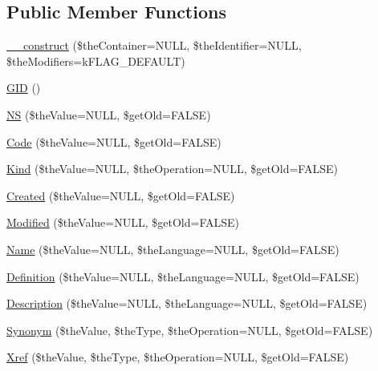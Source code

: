 \subsection*{Public Member Functions}
\begin{DoxyCompactItemize}
\item 
\hyperlink{class_c_ontology_term_object_af1fb502088538ad7372719c20f73bc5c}{\-\_\-\-\_\-construct} (\$the\-Container=N\-U\-L\-L, \$the\-Identifier=N\-U\-L\-L, \$the\-Modifiers=k\-F\-L\-A\-G\-\_\-\-D\-E\-F\-A\-U\-L\-T)
\item 
\hyperlink{class_c_ontology_term_object_ab1a4d21bb56a8a6cf3f77f595d776267}{G\-I\-D} ()
\item 
\hyperlink{class_c_ontology_term_object_a109414a9abe98e3997be238addfda6cf}{N\-S} (\$the\-Value=N\-U\-L\-L, \$get\-Old=F\-A\-L\-S\-E)
\item 
\hyperlink{class_c_ontology_term_object_a07d446b9fde6b99ab766f5c91eeec813}{Code} (\$the\-Value=N\-U\-L\-L, \$get\-Old=F\-A\-L\-S\-E)
\item 
\hyperlink{class_c_ontology_term_object_ad5926fcc0f4263cc31353990c8ab1ad4}{Kind} (\$the\-Value=N\-U\-L\-L, \$the\-Operation=N\-U\-L\-L, \$get\-Old=F\-A\-L\-S\-E)
\item 
\hyperlink{class_c_ontology_term_object_acf58ecff6c65507ecec1d23516c90d02}{Created} (\$the\-Value=N\-U\-L\-L, \$get\-Old=F\-A\-L\-S\-E)
\item 
\hyperlink{class_c_ontology_term_object_a02b5cb0088e68dd82995b86652c01202}{Modified} (\$the\-Value=N\-U\-L\-L, \$get\-Old=F\-A\-L\-S\-E)
\item 
\hyperlink{class_c_ontology_term_object_ac65be024b6949f87bb2f63c93de54ff7}{Name} (\$the\-Value=N\-U\-L\-L, \$the\-Language=N\-U\-L\-L, \$get\-Old=F\-A\-L\-S\-E)
\item 
\hyperlink{class_c_ontology_term_object_a2dd720f2302d9145c6e38d0033c65375}{Definition} (\$the\-Value=N\-U\-L\-L, \$the\-Language=N\-U\-L\-L, \$get\-Old=F\-A\-L\-S\-E)
\item 
\hyperlink{class_c_ontology_term_object_a74afdc8c2b20e2b79648dced7aeee52d}{Description} (\$the\-Value=N\-U\-L\-L, \$the\-Language=N\-U\-L\-L, \$get\-Old=F\-A\-L\-S\-E)
\item 
\hyperlink{class_c_ontology_term_object_a96f637a86e1823dc61b2135a00ddfe26}{Synonym} (\$the\-Value, \$the\-Type, \$the\-Operation=N\-U\-L\-L, \$get\-Old=F\-A\-L\-S\-E)
\item 
\hyperlink{class_c_ontology_term_object_a32bb224840f965d3c2680895b52847c4}{Xref} (\$the\-Value, \$the\-Type, \$the\-Operation=N\-U\-L\-L, \$get\-Old=F\-A\-L\-S\-E)
\end{DoxyCompactItemize}
